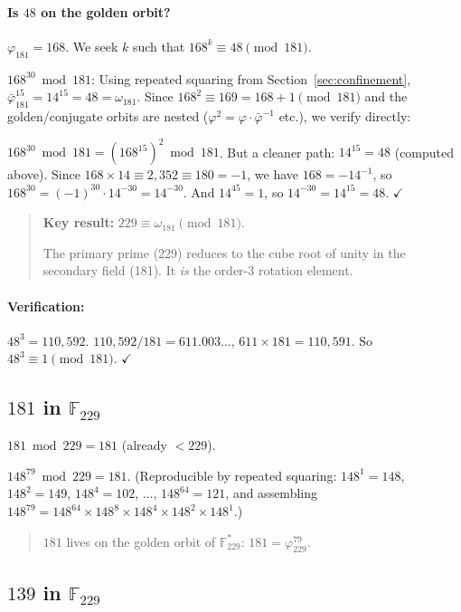\paragraph{Is $48$ on the golden orbit?}
$\varphi_{181} = 168$. We seek $k$ such that $168^k \equiv 48 \pmod{181}$.

$168^{30} \bmod 181$: Using repeated squaring from
Section~\ref{sec:confinement}, $\bar\varphi_{181}^{15} = 14^{15} = 48 = \omega_{181}$.
Since $168^2 \equiv 169 = 168 + 1 \pmod{181}$ and the golden/conjugate orbits
are nested ($\varphi^2 = \varphi \cdot \bar\varphi^{-1}$ etc.), we verify directly:

$168^{30} \bmod 181 = (168^{15})^2 \bmod 181$.
But a cleaner path: $14^{15} = 48$ (computed above). Since $168 \times 14 \equiv 2{,}352
\equiv 180 = -1$, we have $168 = -14^{-1}$, so $168^{30} = (-1)^{30} \cdot 14^{-30}
= 14^{-30}$. And $14^{45} = 1$, so $14^{-30} = 14^{15} = 48$. $\checkmark$

\begin{quote}
\textbf{Key result:} $229 \equiv \omega_{181} \pmod{181}$.

The primary prime (229) reduces to the cube root of unity in the
secondary field (181). It \emph{is} the order-3 rotation element.
\end{quote}

\paragraph{Verification:} $48^3 = 110{,}592$. $110{,}592 / 181 = 611.003\ldots$,
$611 \times 181 = 110{,}591$. So $48^3 \equiv 1 \pmod{181}$. $\checkmark$

\subsection{$181$ in $\mathbb{F}_{229}$}

$181 \bmod 229 = 181$ (already $< 229$).

$148^{79} \bmod 229 = 181$.
(Reproducible by repeated squaring: $148^1 = 148$, $148^2 = 149$,
$148^4 = 102$, $\ldots$, $148^{64} = 121$, and assembling
$148^{79} = 148^{64} \times 148^8 \times 148^4 \times 148^2 \times 148^1$.)

\begin{quote}
$181$ lives on the golden orbit of $\mathbb{F}_{229}^*$:
$181 = \varphi_{229}^{79}$.
\end{quote}

\subsection{$139$ in $\mathbb{F}_{229}$}

